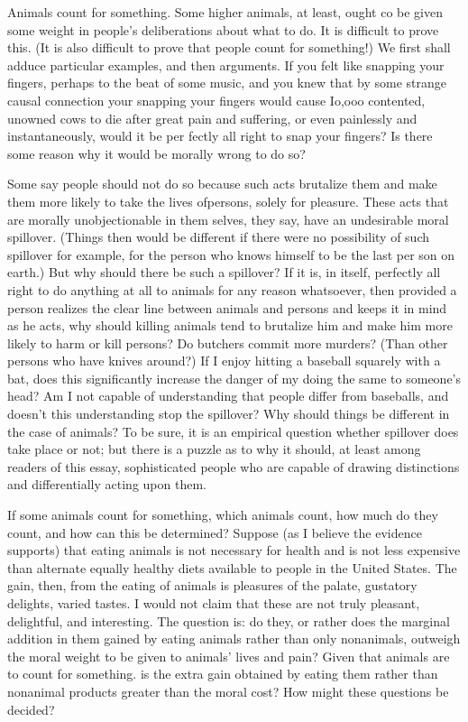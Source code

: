 \documentclass[11pt,openany]{book}
\begin{document}
Animals count for something. Some higher animals, at least, ought co be given some weight in people's deliberations about what to do. It is difficult to prove this. (It is also difficult to prove that people count for something!) We first shall adduce particular examples, and then arguments. If you felt like snapping your fingers, perhaps to the beat of some music, and you knew that by some strange causal connection your snapping your fingers would cause Io,ooo contented, unowned cows to die after great pain and suffering, or even painlessly and instantaneously, would it be per fectly all right to snap your fingers? Is there some reason why it would be morally wrong to do so? 

Some say people should not do so because such acts brutalize them and make them more likely to take the lives ofpersons, solely for pleasure. These acts that are morally unobjectionable in them selves, they say, have an undesirable moral spillover. (Things then would be different if there were no possibility of such spillover for example, for the person who knows himself to be the last per son on earth.) But why should there be such a spillover? If it is, in itself, perfectly all right to do anything at all to animals for any reason whatsoever, then provided a person realizes the clear line between animals and persons and keeps it in mind as he acts, why should killing animals tend to brutalize him and make him more likely to harm or kill persons? Do butchers commit more murders? (Than other persons who have knives around?) If I enjoy hitting a baseball squarely with a bat, does this significantly increase the danger of my doing the same to someone's head? Am I not capable of understanding that people differ from baseballs, and doesn't this understanding stop the spillover? Why should things be different in the case of animals? To be sure, it is an empirical question whether spillover does take place or not; but there is a puzzle as to why it should, at least among readers of this essay, sophisticated people who are capable of drawing distinctions and differentially acting upon them. 

If some animals count for something, which animals count, how much do they count, and how can this be determined? Suppose (as I believe the evidence supports) that eating animals is not necessary for health and is not less expensive than alternate equally healthy diets available to people in the United States. The gain, then, from the eating of animals is pleasures of the palate, gustatory delights, varied tastes. I would not claim that these are not truly pleasant, delightful, and interesting. The question is: do they, or rather does the marginal addition in them gained by eating animals rather than only nonanimals, outweigh the moral weight to be given to animals' lives and pain? Given that animals are to count for something. is the extra gain obtained by eating them rather than nonanimal products greater than the moral cost? How might these questions be decided? 
\end{document}
